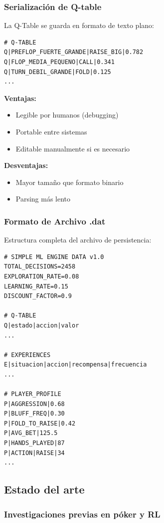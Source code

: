 \documentclass[12pt,a4paper]{article}
\begin{document}
\subsubsection{Serialización de Q-table}

La Q-Table se guarda en formato de texto plano:

\begin{verbatim}
# Q-TABLE
Q|PREFLOP_FUERTE_GRANDE|RAISE_BIG|0.782
Q|FLOP_MEDIA_PEQUENO|CALL|0.341
Q|TURN_DEBIL_GRANDE|FOLD|0.125
...
\end{verbatim}

\textbf{Ventajas:}
\begin{itemize}
    \item Legible por humanos (debugging)
    \item Portable entre sistemas
    \item Editable manualmente si es necesario
\end{itemize}

\textbf{Desventajas:}
\begin{itemize}
    \item Mayor tamaño que formato binario
    \item Parsing más lento
\end{itemize}

\subsubsection{Formato de Archivo .dat}

Estructura completa del archivo de persistencia:

\begin{verbatim}
# SIMPLE ML ENGINE DATA v1.0
TOTAL_DECISIONS=2458
EXPLORATION_RATE=0.08
LEARNING_RATE=0.15
DISCOUNT_FACTOR=0.9

# Q-TABLE
Q|estado|accion|valor
...

# EXPERIENCES
E|situacion|accion|recompensa|frecuencia
...

# PLAYER_PROFILE
P|AGGRESSION|0.68
P|BLUFF_FREQ|0.30
P|FOLD_TO_RAISE|0.42
P|AVG_BET|125.5
P|HANDS_PLAYED|87
P|ACTION|RAISE|34
...
\end{verbatim}

\subsection{Estado del arte}

\subsubsection{Investigaciones previas en póker y RL}
\end{document}
